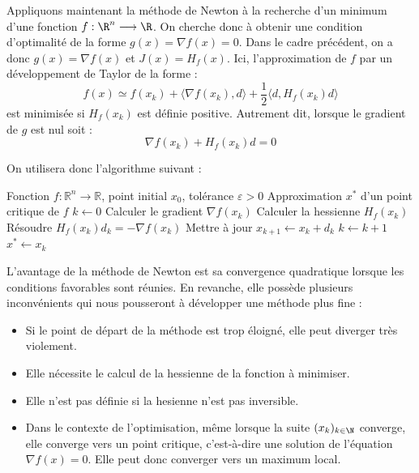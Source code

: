 \begin{proposition}
    Appliquons maintenant la méthode de Newton à la recherche d'un minimum d'une fonction $f : \R^n \longrightarrow \R$. 
    On cherche donc à obtenir une condition d'optimalité de la forme $g(x) = \nabla f(x) = 0$. Dans le 
    cadre précédent, on a donc $g(x) = \nabla f(x)$ et $ J(x) = H_f(x)$. Ici, l'approximation de $f$ 
    par un développement de Taylor de la forme : 
        \begin{equation}
            f(x) \simeq f(x_k) + \langle \nabla f(x_k), d \rangle + \frac{1}{2} \langle d, H_f(x_k) d \rangle
        \end{equation}
    est minimisée si $ H_f(x_k)$ est définie positive. Autrement dit, lorsque le gradient de $g$ est nul soit : 
        \begin{equation}
            \nabla f(x_k) + H_f(x_k)d = 0
        \end{equation}
\end{proposition}

On utilisera donc l'algorithme suivant : 

\begin{algorithm}[H]
    \caption{Méthode de Newton (optimisation)}
    \begin{algorithmic}[1]
        \Require Fonction $f : \mathbb{R}^n \to \mathbb{R}$, point initial $x_0$, tolérance $\varepsilon > 0$
        \Ensure Approximation $x^*$ d’un point critique de $f$
        \State $k \gets 0$
            \State Calculer le gradient $\nabla f(x_k)$
            \State Calculer la hessienne $H_f(x_k)$
            \State Résoudre $H_f(x_k) d_k = - \nabla f(x_k)$
            \State Mettre à jour $x_{k+1} \gets x_k + d_k$
            \State $k \gets k + 1$
        \EndWhile
        \State \Return $x^* \gets x_k$
    \end{algorithmic}
\end{algorithm}


L'avantage de la méthode de Newton est sa convergence quadratique lorsque les conditions favorables sont réunies. 
En revanche, elle possède plusieurs inconvénients qui nous pousseront à développer une méthode plus fine : 
\begin{itemize}
    \item Si le point de départ de la méthode est trop éloigné, elle peut diverger très violement. 
    \item Elle nécessite le calcul de la hessienne de la fonction à minimiser. 
    \item Elle n'est pas définie si la hesienne n'est pas inversible. 
    \item Dans le contexte de l’optimisation, même lorsque la suite $(x_k)_{k \in \N}$
    converge, elle converge vers un point critique, c’est-à-dire une solution de l’équation 
    $ \nabla f(x) = 0$. Elle peut donc converger vers un maximum local.
\end{itemize}

